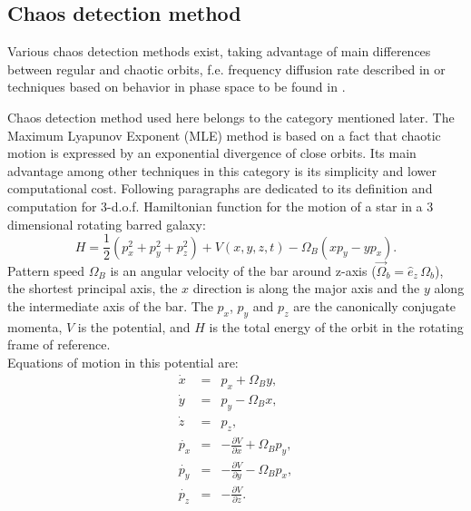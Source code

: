 \documentclass[a4paper,fleqn,usenatbib]{mnras}
\begin{document}
\subsection{Chaos detection method}
\label{sec:chaosdet}
Various chaos detection methods exist, taking advantage of main differences between regular and chaotic orbits, f.e. frequency diffusion rate described in \cite{APW_SuperFreq:2016} or techniques based on behavior in phase space to be found in \cite{Skokos_GALI:2007,SkokosManos_GALI_SALI:2014}.

Chaos detection method used here belongs to the category mentioned later. The Maximum Lyapunov Exponent (MLE) method is based on a fact that chaotic motion is expressed by an exponential divergence of close orbits. Its main advantage among other techniques in this category is its simplicity and lower computational cost. Following paragraphs are dedicated to its definition and computation for 3-d.o.f. Hamiltonian function for the motion of a star in a 3 dimensional rotating barred galaxy:
\begin{equation}\label{eq:Hamilton}
	H=\frac{1}{2} (p_{x}^{2}+p_{y}^{2}+p_{z}^{2})+ V(x,y,z,t) -
	\Omega_B (xp_{y}-yp_{x}).
\end{equation}
Pattern speed $ \Omega_B $ is an angular velocity of the bar around z-axis ($ \vec{\Omega}_b = \hat{e}_z\,\Omega_b $), the shortest principal axis, the $x$ direction is along the major axis and the $y$ along the intermediate axis of the bar. The $p_{x}$, $p_{y}$ and $p_{z}$ are the canonically conjugate momenta, $V$ is the potential, and $H$ is the total energy of the orbit in the rotating frame of reference.\\
Equations of motion in this potential are:
\begin{equation}\label{eq:motion}
	\begin{array}{lcl}
	\dot{x} &=& \displaystyle p_{x} + \Omega_B y, \\
	\dot{y} &=& \displaystyle p_{y} - \Omega_B x,  \\
	\dot{z} &=& \displaystyle p_{z}, \\
	\dot{p_{x}} &=& \displaystyle -\frac{\partial V}{\partial x} + \Omega_B p_{y}, \\
	\dot{p_{y}} &=& \displaystyle -\frac{\partial V}{\partial y} - \Omega_B p_{x}, \\
	\dot{p_{z}} & =& \displaystyle -\frac{\partial V}{\partial z}. \\
	\end{array}
\end{equation}
\end{document}
